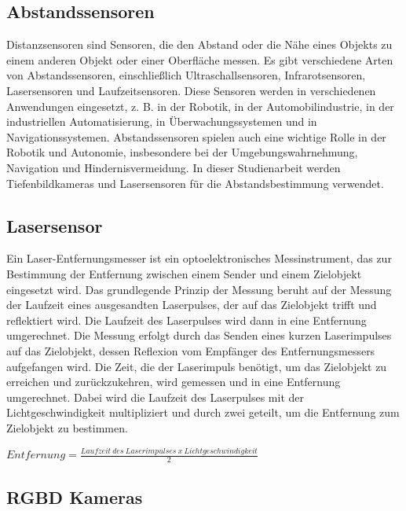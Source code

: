    \subsection{Abstandssensoren} \label{abstandssensoren:subsection}

    Distanzsensoren sind Sensoren, die den Abstand oder die Nähe eines Objekts zu einem anderen Objekt oder einer Oberfläche messen. Es gibt verschiedene Arten von Abstandssensoren, einschließlich Ultraschallsensoren, Infrarotsensoren, Lasersensoren und Laufzeitsensoren. Diese Sensoren werden in verschiedenen Anwendungen eingesetzt, z. B. in der Robotik, in der Automobilindustrie, in der industriellen Automatisierung, in Überwachungssystemen und in Navigationssystemen. Abstandssensoren spielen auch eine wichtige Rolle in der Robotik und Autonomie, insbesondere bei der Umgebungswahrnehmung, Navigation und Hindernisvermeidung. In dieser Studienarbeit werden Tiefenbildkameras und Lasersensoren für die Abstandsbestimmung verwendet.


    \subsection{Lasersensor}
    \label{chp:lasersensor}

    Ein Laser-Entfernungsmesser ist ein optoelektronisches Messinstrument, das zur Bestimmung der Entfernung zwischen einem Sender und einem Zielobjekt eingesetzt wird. Das grundlegende Prinzip der Messung beruht auf der Messung der Laufzeit eines ausgesandten Laserpulses, der auf das Zielobjekt trifft und reflektiert wird. Die Laufzeit des Laserpulses wird dann in eine Entfernung umgerechnet.
    Die Messung erfolgt durch das Senden eines kurzen Laserimpulses auf das Zielobjekt, dessen Reflexion vom Empfänger des Entfernungsmessers aufgefangen wird. Die Zeit, die der Laserimpuls benötigt, um das Zielobjekt zu erreichen und zurückzukehren, wird gemessen und in eine Entfernung umgerechnet. Dabei wird die Laufzeit des Laserpulses mit der Lichtgeschwindigkeit multipliziert und durch zwei geteilt, um die Entfernung zum Zielobjekt zu bestimmen.
    \begin{center}
    \label{math:distance}
    $Entfernung = \frac{Laufzeit\ des\ Laserimpulses\ x\ Lichtgeschwindigkeit}{2}$
    \end{center}


    \subsection{RGBD Kameras}

